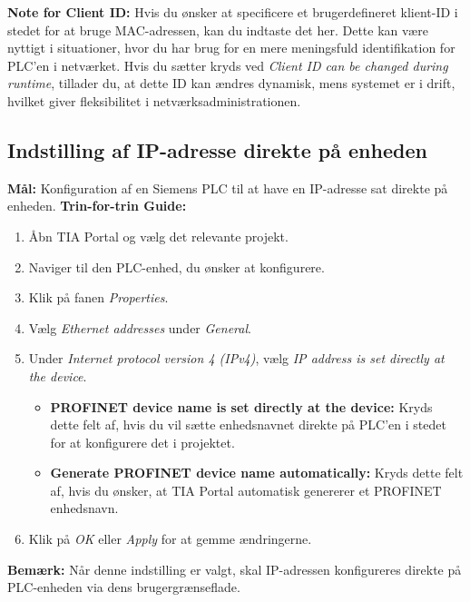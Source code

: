 \newline\newline\noindent \textbf{Note for Client ID:} Hvis du ønsker at specificere et brugerdefineret klient-ID i stedet for at bruge MAC-adressen, kan du indtaste det her. Dette kan være nyttigt i situationer, hvor du har brug for en mere meningsfuld identifikation for PLC'en i netværket. Hvis du sætter kryds ved \textit{Client ID can be changed during runtime}, tillader du, at dette ID kan ændres dynamisk, mens systemet er i drift, hvilket giver fleksibilitet i netværksadministrationen.
\subsection*{Indstilling af IP-adresse direkte på enheden}
\label{subsec:device_ip}

\textbf{Mål:} Konfiguration af en Siemens PLC til at have en IP-adresse sat direkte på enheden.
\newline\newline\noindent
\textbf{Trin-for-trin Guide:}
\begin{enumerate}
	\item Åbn TIA Portal og vælg det relevante projekt.
	\item Naviger til den PLC-enhed, du ønsker at konfigurere.
	\item Klik på fanen \textit{Properties}.
	\item Vælg \textit{Ethernet addresses} under \textit{General}.
	\item Under \textit{Internet protocol version 4 (IPv4)}, vælg \textit{IP address is set directly at the device}.
	\begin{itemize}
		\item \textbf{PROFINET device name is set directly at the device:} Kryds dette felt af, hvis du vil sætte enhedsnavnet direkte på PLC'en i stedet for at konfigurere det i projektet.
		\item \textbf{Generate PROFINET device name automatically:} Kryds dette felt af, hvis du ønsker, at TIA Portal automatisk genererer et PROFINET enhedsnavn.
	\end{itemize}
	\item Klik på \textit{OK} eller \textit{Apply} for at gemme ændringerne.
\end{enumerate}
\textbf{Bemærk:} Når denne indstilling er valgt, skal IP-adressen konfigureres direkte på PLC-enheden via dens brugergrænseflade.


